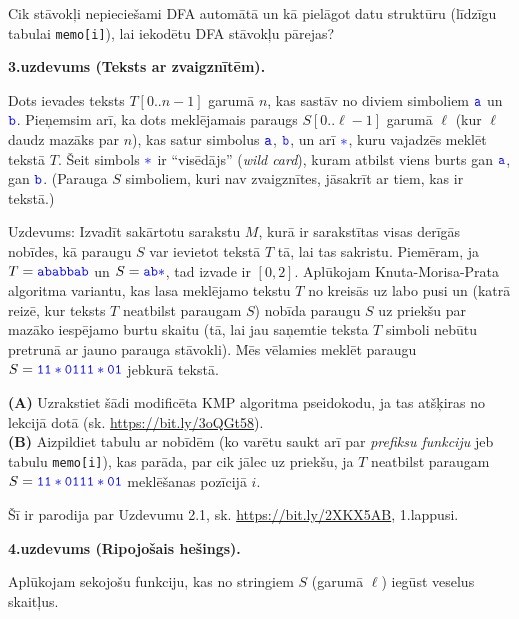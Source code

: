 \documentclass[a4paper]{article}
\begin{document}
Cik stāvokļi nepieciešami DFA automātā un kā pielāgot datu struktūru (līdzīgu tabulai {\tt memo[i]}), 
lai iekodētu DFA stāvokļu pārejas?


\vspace{20pt}
{\bf 3.uzdevums (Teksts ar zvaigznītēm).}

Dots ievades teksts $T[0..n-1]$ garumā $n$, kas sastāv no diviem simboliem
$\textcolor{blue}{\mathtt{a}}$ un $\textcolor{blue}{\mathtt{b}}$.
Pieņemsim arī, ka dots meklējamais paraugs $S[0..\ell-1]$ garumā $\ell$ (kur $\ell$ daudz mazāks par $n$), kas
satur simbolus $\textcolor{blue}{\mathtt{a}}$, $\textcolor{blue}{\mathtt{b}}$, un arī $\textcolor{blue}{\mathtt{\ast}}$, 
kuru vajadzēs meklēt tekstā $T$. Šeit simbols $\textcolor{blue}{\mathtt{\ast}}$ ir ``visēdājs'' ({\em wild card}), 
kuram atbilst viens burts \textendash{} gan $\textcolor{blue}{\mathtt{a}}$, gan 
$\textcolor{blue}{\mathtt{b}}$. (Parauga $S$ simboliem, kuri nav zvaigznītes, jāsakrīt ar tiem, kas ir tekstā.)

Uzdevums: Izvadīt sakārtotu sarakstu $M$, kurā ir sarakstītas visas derīgās nobīdes, kā paraugu $S$ var ievietot 
tekstā $T$ tā, lai tas sakristu. Pie\-mē\-ram, ja $T =\textcolor{blue}{\mathtt{ababbab}}$ un 
$S=\textcolor{blue}{\mathtt{ab\ast}}$, tad izvade ir $[0,2]$.
Aplūkojam Knuta-Morisa-Prata algoritma variantu, kas lasa meklējamo tekstu $T$ no kreisās uz labo pusi un 
(katrā reizē, kur teksts $T$ neatbilst paraugam $S$) nobīda paraugu $S$ uz priekšu par mazāko iespējamo burtu skaitu 
(tā, lai jau saņemtie teksta $T$ simboli nebūtu pretrunā ar jauno parauga stāvokli). 
Mēs vēlamies meklēt paraugu $S = \textcolor{blue}{\mathtt{11\ast0111\ast01}}$ jebkurā tekstā.

{\bf (A)} Uzrakstiet šādi modificēta KMP algoritma pseidokodu, ja tas atšķiras no lekcijā dotā (sk. \url{https://bit.ly/3oQGt58}).\\
{\bf (B)} Aizpildiet tabulu ar nobīdēm (ko varētu saukt arī par {\em prefiksu funkciju} jeb tabulu {\tt memo[i]}), kas parāda, 
par cik jālec uz priekšu, ja $T$ neatbilst paraugam $S = \textcolor{blue}{\mathtt{11\ast0111\ast01}}$ meklēšanas pozīcijā $i$.

Šī ir parodija par Uzdevumu 2.1, sk. \url{https://bit.ly/2XKX5AB}, 1.lappusi.






\vspace{10pt}
{\bf 4.uzdevums (Ripojošais hešings).}

Aplūkojam sekojošu funkciju, kas no stringiem $S$ (garumā $\ell$) iegūst
veselus skaitļus.
\end{document}
